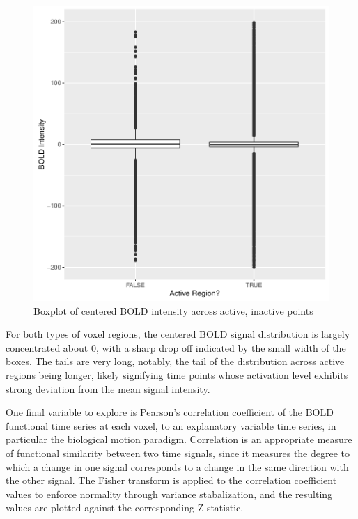 \documentclass{report}
\begin{document}
\begin{figure}
\caption{Boxplot of centered BOLD intensity across active, inactive points}
\label{fig:figure5}
\includegraphics{Milestone-008}
\end{figure}

For both types of voxel regions, the centered BOLD signal distribution is largely concentrated about 0, with a sharp drop off indicated by the small width of the boxes. The tails are very long, notably, the tail of the distribution across active regions being longer, likely signifying time points whose activation level exhibits strong deviation from the mean signal intensity. 

One final variable to explore is Pearson's correlation coefficient of the BOLD functional time series at each voxel, to an explanatory variable time series, in particular the biological motion paradigm. Correlation is an appropriate measure of functional similarity between two time signals, since it measures the degree to which a change in one signal corresponds to a change in the same direction with the other signal. The Fisher transform is applied to the correlation coefficient values to enforce normality through variance stabalization, and the resulting values are plotted against the corresponding Z statistic.
\end{document}
